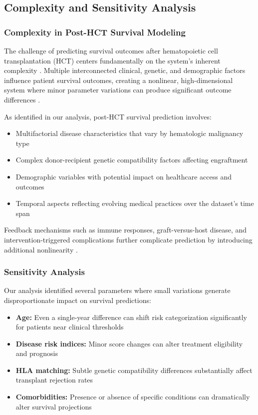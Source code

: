 \subsection{Complexity and Sensitivity Analysis}

\subsubsection{Complexity in Post-HCT Survival Modeling}

The challenge of predicting survival outcomes after hematopoietic cell transplantation (HCT) centers fundamentally on the system's inherent complexity \cite{astct_simplification}. Multiple interconnected clinical, genetic, and demographic factors influence patient survival outcomes, creating a nonlinear, high-dimensional system where minor parameter variations can produce significant outcome differences \cite{frontiers_ai_hct}.

As identified in our analysis, post-HCT survival prediction involves:

\begin{itemize}
    \item Multifactorial disease characteristics that vary by hematologic malignancy type \cite{ash_transplant_all}
    \item Complex donor-recipient genetic compatibility factors affecting engraftment \cite{mdpi_cells}
    \item Demographic variables with potential impact on healthcare access and outcomes \cite{jama_ai_medicine}
    \item Temporal aspects reflecting evolving medical practices over the dataset's time span \cite{mdpi_cancers}
\end{itemize}

Feedback mechanisms such as immune responses, graft-versus-host disease, and intervention-triggered complications further complicate prediction by introducing additional nonlinearity \cite{ash_chronic_gvhd}.

\subsubsection{Sensitivity Analysis}

Our analysis identified several parameters where small variations generate disproportionate impact on survival predictions:

\begin{itemize}
    \item \textbf{Age:} Even a single-year difference can shift risk categorization significantly for patients near clinical thresholds \cite{stmcls_clonality}
    \item \textbf{Disease risk indices:} Minor score changes can alter treatment eligibility and prognosis \cite{uptodate_hct}
    \item \textbf{HLA matching:} Subtle genetic compatibility differences substantially affect transplant rejection rates \cite{frontiers_immunology}
    \item \textbf{Comorbidities:} Presence or absence of specific conditions can dramatically alter survival projections \cite{mdpi_cancers}
\end{itemize}


